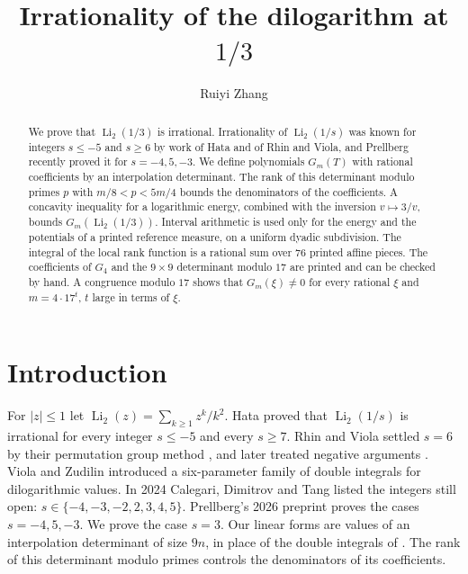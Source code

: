\documentclass{amsart}
\numberwithin{equation}{section}
\numberwithin{table}{section}
\newcommand{\Li}{\operatorname{Li}}
\newcommand{\Rseam}{8}
\newcommand{\nslabs}{76}
\begin{document}
\title{Irrationality of the dilogarithm at $1/3$}
\author{Ruiyi Zhang}
\address{Independent Researcher, Columbia, Maryland, USA}

\begin{abstract}
We prove that $\operatorname{Li}_2(1/3)$ is irrational. Irrationality of
$\operatorname{Li}_2(1/s)$ was known for integers $s\le-5$ and $s\ge6$ by
work of Hata and of Rhin and Viola, and Prellberg recently proved it for
$s=-4,5,-3$. We define polynomials $G_m(T)$ with rational coefficients by an
interpolation determinant. The rank of this determinant modulo primes
$p$ with $m/\Rseam<p<5m/4$ bounds the denominators of the coefficients. A
concavity inequality for a logarithmic energy, combined with the inversion
$v\mapsto3/v$, bounds $G_m(\operatorname{Li}_2(1/3))$. Interval
arithmetic is used only for the energy and the potentials of a
printed reference measure, on a uniform dyadic subdivision. The integral of the local rank function is a rational
sum over $\nslabs$ printed affine pieces. The coefficients of $G_4$
and the $9\times9$ determinant modulo $17$ are printed and can be checked by hand. A
congruence modulo $17$ shows that $G_m(\xi)\ne0$ for every rational $\xi$
and $m=4\cdot17^t$, $t$ large in terms of $\xi$.
\end{abstract}

\maketitle

\section{Introduction}\label{sec:intro}

For $|z|\le1$ let $\Li_2(z)=\sum_{k\ge1}z^k/k^2$.
Hata \cite[Theorem~1.1]{Ha} proved that $\Li_2(1/s)$ is irrational
for every integer $s\le-5$ and every $s\ge7$.
Rhin and Viola settled $s=6$ by their permutation group method
\cite[Section~6]{RV05}, and later treated negative arguments
\cite[Theorem~2.1 and Section~4]{RV19}.
Viola and Zudilin \cite{VZ} introduced a six-parameter family of double
integrals for dilogarithmic values.
In 2024 Calegari, Dimitrov and Tang
\cite[Remark~2.8.2 and Section~15.2]{CDT} listed the integers still open:
$s\in\{-4,-3,-2,2,3,4,5\}$.
Prellberg's 2026 preprint \cite[Theorem~1.1]{Pr} proves the cases $s=-4,5,-3$.
We prove the case $s=3$.
Our linear forms are values of an interpolation determinant of size $9n$,
in place of the double integrals of \cite{Ha,Pr,RV05,VZ}. The rank of this
determinant modulo primes controls the denominators of its coefficients.
\end{document}

